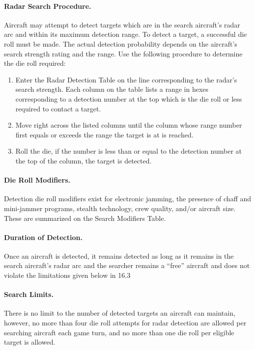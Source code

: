 \paragraph{Radar Search Procedure.} Aircraft may attempt to detect targets which are in the search aircraft's radar arc and within its maximum detection range. To detect a target, a successful die roll must be made. The actual detection probability depends on the aircraft's search strength rating and the range. Use the following procedure to determine the die roll required:

\begin{enumerate}
    \item Enter the Radar Detection Table on the line corresponding to the radar's search strength. Each column on the table lists a range in hexes corresponding to a detection number at the top which is the die roll or less required to contact a target.
    \item Move right across the listed columns until the column whose range number first equals or exceeds the range the target is at is reached.
    \item Roll the die, if the number is less than or equal to the detection number at the top of the column, the target is detected.
\end{enumerate}

\paragraph{Die Roll Modifiers.} Detection die roll modifiers exist for electronic jamming, the presence of chaff and mini-jammer programs, stealth technology, crew quality, and/or aircraft size. These are summarized on the Search Modifiers Table.

\paragraph{Duration of Detection.} Once an aircraft is detected, it remains detected as long as it remains in the search aircraft's radar arc and the searcher remains a “free” aircraft and does not violate the limitations given below in 16.3

\paragraph{Search Limits.} There is no limit to the number of detected targets an aircraft can maintain, however, no more than four die roll attempts for radar detection are allowed per searching aircraft each game turn, and no more than one die roll per eligible target is allowed.


